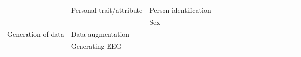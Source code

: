 \begin{tabular}{p{1.5cm}p{1.5cm}p{1.5cm}p{1.5cm}p{0.6cm}p{0.6cm}p{0.6cm}p{0.6cm}p{0.6cm}p{0.6cm}p{0.6cm}p{0.6cm}p{0.6cm}p{0.6cm}p{0.6cm}}
                                & Personal trait/attribute & Person identification &   &                                                             &                                                                                                                             &                                                                        &                  &                                      &                                                            &                      &                       &                                 &                         &                                        \cite{Zhang2017e, Zhang2017c} \\
                                &                 & Sex &   &                                                             &                                                                                                       \cite{VanPutten2018b} &                                                                        &                  &                                      &                                                            &                      &                       &                                 &                         &                                                                      \\
Generation of data & Data augmentation &   &   &                                                             &                                                                                 \cite{Wang2018, Zhang2018b, Schwabedal2018} &                                                                        &                  &                                      &                                                            &                      &                       &                                 &                         &                                                                      \\
                                & Generating EEG &   &   &                                                             &                                                                                                                             &                                                                        &                  &                                      &                                                            &  \cite{Hartmann2018} &                       &                                 &                         &                                                                      \\

\end{tabular}
